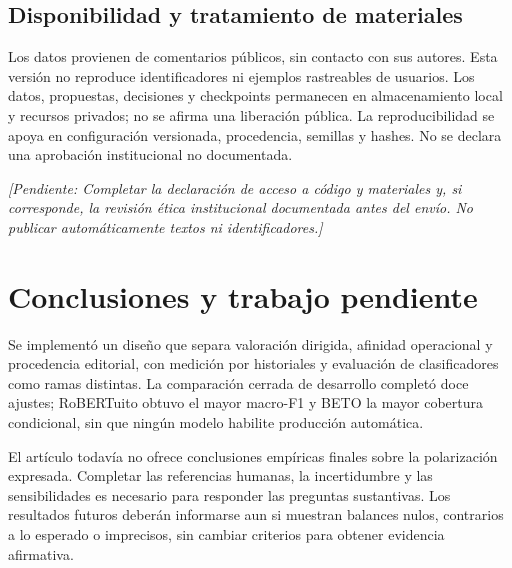 \documentclass[conference,letterpaper]{IEEEtran}
\newcommand{\pendiente}[1]{\par\smallskip\noindent\textit{[Pendiente: #1]}\par\smallskip}
\begin{document}
\subsection{Disponibilidad y tratamiento de materiales}
Los datos provienen de comentarios públicos, sin contacto con sus autores. Esta versión no reproduce identificadores ni ejemplos rastreables de usuarios. Los datos, propuestas, decisiones y checkpoints permanecen en almacenamiento local y recursos privados; no se afirma una liberación pública. La reproducibilidad se apoya en configuración versionada, procedencia, semillas y hashes. No se declara una aprobación institucional no documentada.
\pendiente{Completar la declaración de acceso a código y materiales y, si corresponde, la revisión ética institucional documentada antes del envío. No publicar automáticamente textos ni identificadores.}

\section{Conclusiones y trabajo pendiente}
Se implementó un diseño que separa valoración dirigida, afinidad operacional y procedencia editorial, con medición por historiales y evaluación de clasificadores como ramas distintas. La comparación cerrada de desarrollo completó doce ajustes; RoBERTuito obtuvo el mayor macro-F1 y BETO la mayor cobertura condicional, sin que ningún modelo habilite producción automática.

El artículo todavía no ofrece conclusiones empíricas finales sobre la polarización expresada. Completar las referencias humanas, la incertidumbre y las sensibilidades es necesario para responder las preguntas sustantivas. Los resultados futuros deberán informarse aun si muestran balances nulos, contrarios a lo esperado o imprecisos, sin cambiar criterios para obtener evidencia afirmativa.



\end{document}

